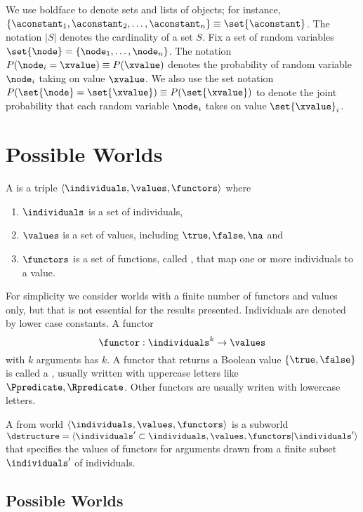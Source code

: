 \documentclass{article}
\begin{document}
We use boldface to denote sets and lists of objects; for instance, $\{\aconstant_{1},\aconstant_{2},\ldots, \aconstant_{n}\} \equiv \set{\aconstant}$. The notation $|S|$ denotes the cardinality of a set $S$. Fix a set of random variables $\set{\node} = \{\node_{1},\ldots,\node_{n}\}$. 
The notation $P(\node_{i} = \xvalue)\equiv P(\xvalue)$ denotes the probability of random variable $\node_{i}$ taking on value $\xvalue$. We also use the set notation $P(\set{\node} = \set{\xvalue}) \equiv P(\set{\xvalue})$ to denote the joint probability that each random variable $\node_{i}$ takes on value $\set{\xvalue}_{i}$. 


\section{Possible Worlds}
A  is a triple $\langle \individuals, \values, \functors\rangle$ where

\begin{enumerate}
\item $\individuals$ is a set of individuals,
\item $\values$ is a set of values, including $\true,\false, \na$ and
\item $\functors$ is a set of functions, called , that map one or more individuals to a value.
\end{enumerate}

For simplicity we consider worlds with a finite number of functors and values only, but that is not essential for the results presented. Individuals are denoted by lower case constants.
A functor $$\functor: \individuals^{k} \rightarrow \values$$ with $k$ arguments has  $k$. A functor that returns a Boolean value $\{\true,\false\}$ is called a , usually written with uppercase letters like $\Ppredicate,\Rpredicate$. Other functors are usually writen with lowercase letters. 

A  from world $\langle \individuals, \values, \functors\rangle$ is a subworld $\dstructure = \langle \individuals' \subset \individuals, \values, \functors|\individuals'\rangle$ that specifies the values of functors for arguments drawn from a finite subset $\individuals'$ of individuals.

\subsection{Possible Worlds}
\end{document}
